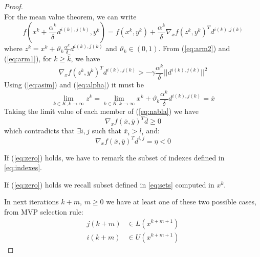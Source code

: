 \begin{proof}
\begin{equation}
\end{equation}
For the mean value theorem, we can write
\begin{equation}\label{eq:arm2}
f(x^k + \frac{\alpha^k}{\delta} d^{i(k),j(k)}, y^k) = f(x^k, y^k) + \frac{\alpha^k}{\delta} \nabla_x f(z^k, y^k)^T d^{i(k),j(k)}
\end{equation}
where $z^k = x^k + \vartheta_k \frac{\alpha^k}{\delta} d^{i(k),j(k)}$ and $\vartheta_k \in (0,1)$. From (\ref{eq:arm2}) and (\ref{eq:arm1}), for $k \geq \hat{k}$, we have
\begin{equation}\label{eq:nabla}
\nabla_x f(z^k, y^k)^T d^{i(k),j(k)}  >- \gamma \frac{\alpha^k}{\delta} ||d^{i(k),j(k)}||^2
\end{equation}
Using (\ref{eq:asim}) and (\ref{eq:alpha}) it must be
\begin{equation}
\lim_{k \in K, k \rightarrow \infty} z^k = \lim_{k \in K, k \rightarrow \infty} x^k + \vartheta_k \frac{\alpha^k}{\delta} d^{i(k),j(k)} = \overline{x}
\end{equation}
Taking the limit value of each member of (\ref{eq:nabla}) we have
\begin{equation}
\nabla_x f(\overline{x},\overline{y})^T \overline{d} \geq 0 %
\end{equation}
which contradicts that $\exists i,j$ such that $\overline{x}_i >l_i$ and:
\begin{equation}
\nabla_x f(\overline{x},\overline{y})^T d^{i,j} =\eta <0
\end{equation}


If (\ref{eq:zero}) holds, we have to remark the subset of indexes defined in \ref{eq:indexes}.

\iffalse
If (\ref{eq:zero}) holds we recall subset defined in \ref{eq:sets} computed in $x^k$.

In next iterations $k+m$, $m\ge 0$ we have at least one of these two possible cases, from MVP selection rule:
\begin{subequations}
\begin{align}
 j(k+m) &\in L(x^{k+m+1})\label{eq:SetCasesA}\\
 i(k+m) &\in U(x^{k+m+1})\label{eq:SetCasesB}
\end{align}
\end{subequations}


\end{proof}

